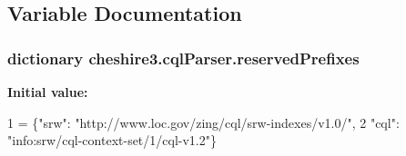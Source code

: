 \subsection{Variable Documentation}
\hypertarget{namespacecheshire3_1_1cql_parser_a006722b35c02d1e7f44cb9e8e9959867}{
\subsubsection[{reserved\-Prefixes}]{\setlength{\rightskip}{0pt plus 5cm}dictionary cheshire3.\-cql\-Parser.\-reserved\-Prefixes}}\label{namespacecheshire3_1_1cql_parser_a006722b35c02d1e7f44cb9e8e9959867}
{\bfseries Initial value\-:}
\begin{DoxyCode}
1 = \{\textcolor{stringliteral}{"srw"}: \textcolor{stringliteral}{"http://www.loc.gov/zing/cql/srw-indexes/v1.0/"},
2                     \textcolor{stringliteral}{"cql"}: \textcolor{stringliteral}{"info:srw/cql-context-set/1/cql-v1.2"}\}
\end{DoxyCode}
